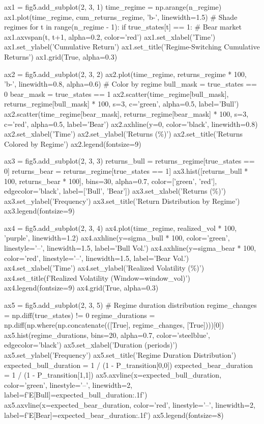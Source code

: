 \documentclass[a4paper, 11pt]{article}
\begin{document}
\begin{pycode}
ax1 = fig5.add_subplot(2, 3, 1)
time_regime = np.arange(n_regime)
ax1.plot(time_regime, cum_returns_regime, 'b-', linewidth=1.5)
# Shade regimes
for t in range(n_regime - 1):
    if true_states[t] == 1:  # Bear market
        ax1.axvspan(t, t+1, alpha=0.2, color='red')
ax1.set_xlabel('Time')
ax1.set_ylabel('Cumulative Return')
ax1.set_title('Regime-Switching Cumulative Returns')
ax1.grid(True, alpha=0.3)

ax2 = fig5.add_subplot(2, 3, 2)
ax2.plot(time_regime, returns_regime * 100, 'b-', linewidth=0.8, alpha=0.6)
# Color by regime
bull_mask = true_states == 0
bear_mask = true_states == 1
ax2.scatter(time_regime[bull_mask], returns_regime[bull_mask] * 100,
            s=3, c='green', alpha=0.5, label='Bull')
ax2.scatter(time_regime[bear_mask], returns_regime[bear_mask] * 100,
            s=3, c='red', alpha=0.5, label='Bear')
ax2.axhline(y=0, color='black', linewidth=0.8)
ax2.set_xlabel('Time')
ax2.set_ylabel('Returns (\%)')
ax2.set_title('Returns Colored by Regime')
ax2.legend(fontsize=9)

ax3 = fig5.add_subplot(2, 3, 3)
returns_bull = returns_regime[true_states == 0]
returns_bear = returns_regime[true_states == 1]
ax3.hist([returns_bull * 100, returns_bear * 100], bins=30,
         alpha=0.7, color=['green', 'red'], edgecolor='black',
         label=['Bull', 'Bear'])
ax3.set_xlabel('Returns (\%)')
ax3.set_ylabel('Frequency')
ax3.set_title('Return Distribution by Regime')
ax3.legend(fontsize=9)

ax4 = fig5.add_subplot(2, 3, 4)
ax4.plot(time_regime, realized_vol * 100, 'purple', linewidth=1.2)
ax4.axhline(y=sigma_bull * 100, color='green', linestyle='--',
            linewidth=1.5, label='Bull Vol.')
ax4.axhline(y=sigma_bear * 100, color='red', linestyle='--',
            linewidth=1.5, label='Bear Vol.')
ax4.set_xlabel('Time')
ax4.set_ylabel('Realized Volatility (\%)')
ax4.set_title(f'Realized Volatility (Window={window_vol})')
ax4.legend(fontsize=9)
ax4.grid(True, alpha=0.3)

ax5 = fig5.add_subplot(2, 3, 5)
# Regime duration distribution
regime_changes = np.diff(true_states) != 0
regime_durations = np.diff(np.where(np.concatenate(([True], regime_changes, [True])))[0])
ax5.hist(regime_durations, bins=20, alpha=0.7, color='steelblue',
         edgecolor='black')
ax5.set_xlabel('Duration (periods)')
ax5.set_ylabel('Frequency')
ax5.set_title('Regime Duration Distribution')
expected_bull_duration = 1 / (1 - P_transition[0,0])
expected_bear_duration = 1 / (1 - P_transition[1,1])
ax5.axvline(x=expected_bull_duration, color='green', linestyle='--',
            linewidth=2, label=f'E[Bull]={expected_bull_duration:.1f}')
ax5.axvline(x=expected_bear_duration, color='red', linestyle='--',
            linewidth=2, label=f'E[Bear]={expected_bear_duration:.1f}')
ax5.legend(fontsize=8)


\end{pycode}
\end{document}
